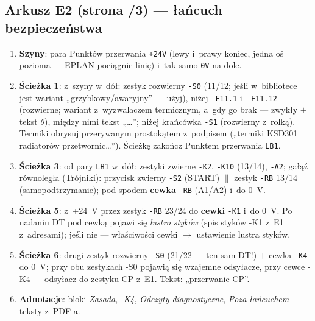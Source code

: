 \documentclass[11pt,a4paper]{article}
\begin{document}
\subsection{Arkusz E2 (strona /3) --- łańcuch bezpieczeństwa}
\begin{enumerate}
\item \textbf{Szyny}: para Punktów przerwania \texttt{+24V} (lewy i~prawy koniec, jedna oś pozioma ---
EPLAN pociągnie linię) i~tak samo \texttt{0V} na dole.
\item \textbf{Ścieżka 1}: z~szyny w~dół: zestyk rozwierny \texttt{-S0} (11/12; jeśli w~bibliotece jest
wariant „grzybkowy/awaryjny'' --- użyj), niżej \texttt{-F11.1} i~\texttt{-F11.12} (rozwierne; wariant
z~wyzwalaczem termicznym, a~gdy go brak --- zwykły $+$ tekst $\theta$), między nimi tekst „\ldots'';
niżej krańcówka \texttt{-S1} (rozwierny z~rolką). Termiki obrysuj przerywanym prostokątem z~podpisem
(„termiki KSD301 radiatorów przetwornic\ldots''). Ścieżkę zakończ Punktem przerwania \texttt{LB1}.
\item \textbf{Ścieżka 3}: od pary \texttt{LB1} w~dół: zestyki zwierne \texttt{-K2}, \texttt{-K10} (13/14),
\texttt{-A2}; gałąź równoległa (Trójniki): przycisk zwierny \texttt{-S2} (START) $\parallel$ zestyk
\texttt{-RB} 13/14 (samopodtrzymanie); pod spodem \textbf{cewka} \texttt{-RB} (A1/A2) i~do 0~V.
\item \textbf{Ścieżka 5}: z~+24~V przez zestyk \texttt{-RB} 23/24 do \textbf{cewki} \texttt{-K1}
i~do 0~V. Po nadaniu DT pod cewką pojawi się \emph{lustro styków} (spis styków -K1 z~E1 z~adresami);
jeśli nie --- właściwości cewki $\to$ ustawienie lustra styków.
\item \textbf{Ścieżka 6}: drugi zestyk rozwierny \texttt{-S0} (21/22 --- ten sam DT!) $+$ cewka
\texttt{-K4} do 0~V; przy obu zestykach -S0 pojawią się wzajemne odsyłacze, przy cewce -K4 --- odsyłacz
do zestyku CP z~E1. Tekst: „przerwanie CP''.
\item \textbf{Adnotacje}: bloki \emph{Zasada}, \emph{-K4}, \emph{Odczyty diagnostyczne},
\emph{Poza łańcuchem} --- teksty z~PDF-a.
\end{enumerate}
\end{document}
